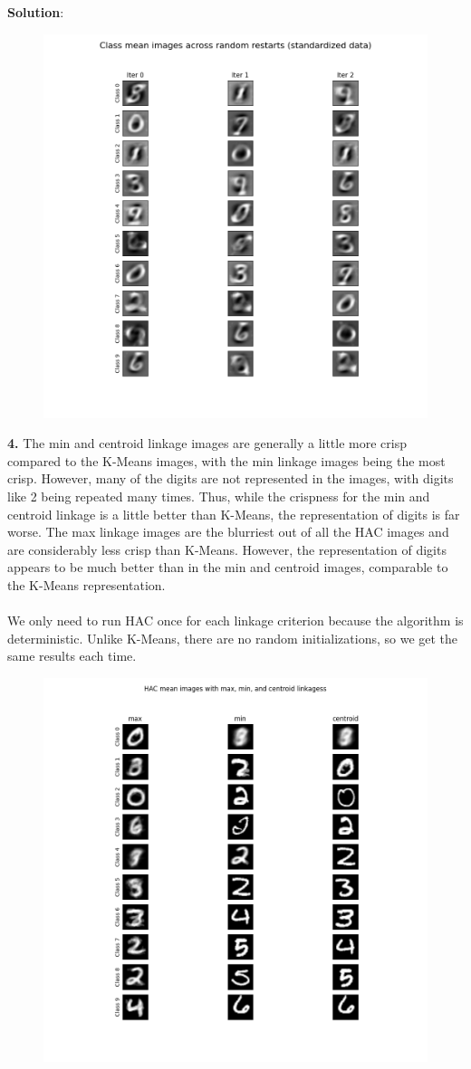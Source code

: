 \documentclass[submit]{../harvardml}
\newenvironment{solution}{
    \vspace{2mm}
    \color{blue}\noindent\textbf{Solution}:
}{}
\begin{document}
\begin{solution}
    \begin{figure}[H]
        \centering
        \includegraphics[width=0.6\linewidth]{hw4/img_output/p2.3.png}
    \end{figure}
    \textbf{4.} The min and centroid linkage images are generally a little more crisp compared to the K-Means images, with the min linkage images being the most crisp. However, many of the digits are not represented in the images, with digits like 2 being repeated many times. Thus, while the crispness for the min and centroid linkage is a little better than K-Means, the representation of digits is far worse. The max linkage images are the blurriest out of all the HAC images and are considerably less crisp than K-Means. However, the representation of digits appears to be much better than in the min and centroid images, comparable to the K-Means representation.
    \\
    \\
    We only need to run HAC once for each linkage criterion because the algorithm is deterministic. Unlike K-Means, there are no random initializations, so we get the same results each time.
    \begin{figure}[H]
        \centering
        \includegraphics[width=0.6\linewidth]{hw4/img_output/p2.4.png}

\end{figure}
\end{solution}
\end{document}
